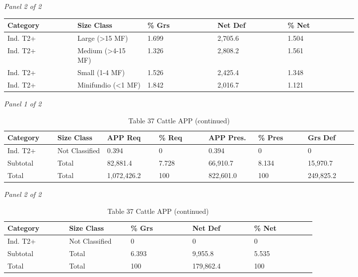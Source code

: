 \documentclass[12pt]{article}
\begin{document}
\begin{landscape}
\begin{table}[H]
\textit{Panel 2 of 2}\\[2pt]
{\fontsize{12}{14}\selectfont
\setlength{\tabcolsep}{3pt}
\renewcommand{\arraystretch}{1.08}
\begin{tabular}{p{0.164\linewidth}p{0.164\linewidth}p{0.164\linewidth}p{0.164\linewidth}p{0.164\linewidth}}
\toprule
Category & Size Class & \% Grs & Net Def & \% Net \\
\midrule
Ind. T2+ & Large (>15 MF) & 1.699 & 2,705.6 & 1.504 \\
Ind. T2+ & Medium (>4-15 MF) & 1.326 & 2,808.2 & 1.561 \\
Ind. T2+ & Small (1-4 MF) & 1.526 & 2,425.4 & 1.348 \\
Ind. T2+ & Minifundio (<1 MF) & 1.842 & 2,016.7 & 1.121 \\
\bottomrule
\end{tabular}
}
\end{table}
\begin{table}[H]
\centering
\caption{Table 37 Cattle APP (continued)}
\textit{Panel 1 of 2}\\[2pt]
{\fontsize{12}{14}\selectfont
\setlength{\tabcolsep}{3pt}
\renewcommand{\arraystretch}{1.08}
\begin{tabular}{p{0.117\linewidth}p{0.117\linewidth}p{0.117\linewidth}p{0.117\linewidth}p{0.117\linewidth}p{0.117\linewidth}p{0.117\linewidth}}
\toprule
Category & Size Class & APP Req & \% Req & APP Pres. & \% Pres & Grs Def \\
\midrule
Ind. T2+ & Not Classified & 0.394 & 0 & 0.394 & 0 & 0 \\
Subtotal & Total & 82,881.4 & 7.728 & 66,910.7 & 8.134 & 15,970.7 \\
Total & Total & 1,072,426.2 & 100 & 822,601.0 & 100 & 249,825.2 \\
\bottomrule
\end{tabular}
}

\vspace{0.6em}

\textit{Panel 2 of 2}\\[2pt]
{\fontsize{12}{14}\selectfont
\setlength{\tabcolsep}{3pt}
\renewcommand{\arraystretch}{1.08}
\begin{tabular}{p{0.164\linewidth}p{0.164\linewidth}p{0.164\linewidth}p{0.164\linewidth}p{0.164\linewidth}}
\toprule
Category & Size Class & \% Grs & Net Def & \% Net \\
\midrule
Ind. T2+ & Not Classified & 0 & 0 & 0 \\
Subtotal & Total & 6.393 & 9,955.8 & 5.535 \\
Total & Total & 100 & 179,862.4 & 100 \\
\bottomrule
\end{tabular}
}
\end{table}
\end{landscape}
\end{document}
